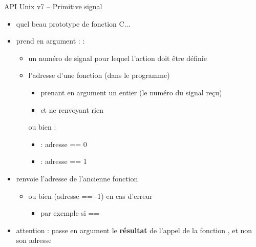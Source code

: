 \begin {frame} {API Unix v7 -- Primitive signal}

    \begin {itemize}
	\item quel beau prototype de fonction C...
	\item {} prend en argument : :
	    \begin {itemize}
		\item un numéro de signal pour lequel
		    l'action doit être définie
		\item l'adresse d'une fonction (dans le programme)
		    \begin {itemize}
			\item prenant en argument un entier
			    (le numéro du signal reçu)
			\item et ne renvoyant rien
		    \end {itemize}
		    ou bien :
		    \begin {itemize}
			\item {} : adresse == 0 
			\item {} : adresse == 1
		    \end {itemize}
	    \end {itemize}
	\item {} renvoie l'adresse de l'ancienne fonction
	    \begin {itemize}
		\item ou bien  (adresse == -1) en cas d'erreur
		    \begin {itemize}
			\item par exemple si  == 
		    \end {itemize}
	    \end {itemize}
	\item attention :  passe en
	    argument le \textbf {résultat} de l'appel de la fonction
	    , et non son adresse

    \end {itemize}
\end {frame}

